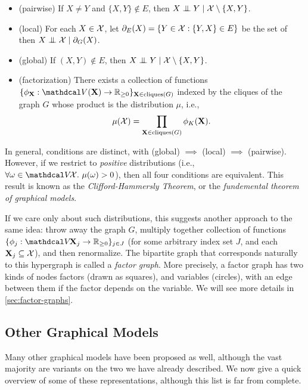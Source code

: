 \begin{itemize}[nosep]
    \item (pairwise) 
        If $X \ne Y$ and $\{X, Y\} \notin E$, then $X \mathrel{\perp\mspace{-10mu}\perp} Y \mid \mathcal X \setminus \{X, Y\}$.  
    \item (local) 
        For each $X \in \mathcal X$, let $\partial_E(X) = \{ Y \in \mathcal X : \{Y,X\} \in E \}$ be the set of then $X \mathrel{\perp\mspace{-10mu}\perp} \mathcal X \mid \partial_G(X)$.  
    \item (global)
        If $(X,Y) \notin E$, then $X \mathrel{\perp\mspace{-10mu}\perp} Y \mid \mathcal X \setminus \{X, Y\}$.  
    \item (factorization) 
        There exists a collection of functions 
        $\{ \phi_{\mat X} : \V(\mat X)\to \mathbb R_{\ge 0} \}_{\mat X \in \mathrm{cliques}(G)}$
        indexed by the cliques of the graph $G$
        whose product is the distribution $\mu$,
        i.e.,
        \[
            \mu(\mathcal X) = \prod_{\mathbf X \in \mathrm{cliques}(G)} \phi_K(\mathbf X).
        \]
\end{itemize}

In general, conditions are distinct, with (global) $\implies$ (local) $\implies$ (pairwise). 
However, if we restrict to \emph{positive} distributions (i.e., $\forall \omega \in \V\!\X.~\mu(\omega) > 0 $), then all four conditions are equivalent.
This result is
known as the \emph{Clifford-Hammersly Theorem}, or the \emph{fundemental theorem of graphical models}. 

If we care only about such distributions, this suggests another approach to the same idea: throw away the graph $G$, multiply together collection of functions $\{ \phi_{j} : \V \! \mat X_{j} \to \mathbb R_{\ge 0} \}_{j \in J}$ (for some arbitrary index set $J$, and each $\mathbf X_j \subseteq \mathcal X$), and then renormalize. 
%
The bipartite graph that corresponds naturally to this hypergraph is called a \emph{factor graph}. 
More precisely, a factor graph has two kinds of nodes factors (drawn as squares), and variables (circles), with an edge between them if the factor depends on the variable.
We will see more details in \cref{sec:factor-graphs}.


\subsection{Other Graphical Models}

Many other graphical models have been proposed as well, although
the vast majority are variants on the two we have already described. 
We now give a quick overview of some of these representations, although this list is far from complete. 

